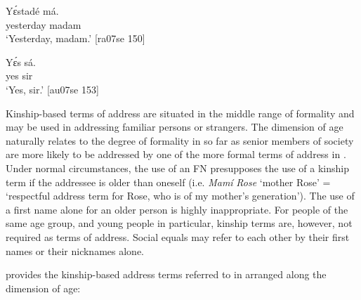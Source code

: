 \ea%
    \label{ex:key:1675}
    \gll Yɛ́stadé    má.\\
yesterday  madam\\

\glt ‘Yesterday, madam.’ [ra07se 150]
\z


\ea%
    \label{ex:key:1676}
    \gll Yɛ́s  sá.\\
yes  sir\\

\glt ‘Yes, sir.’ [au07se 153]
\z

Kinship-based terms of address are situated in the middle range of formality and may be used in addressing familiar persons or strangers. The dimension of age naturally relates to the degree of formality in so far as senior members of society are more likely to be addressed by one of the more formal terms of address in . Under normal circumstances, the use of an FN presupposes the use of a kinship term if the addressee is older than oneself (i.e. \textit{Mamí} \textit{Rose} ‘mother Rose’ = ‘respectful address term for Rose, who is of my mother’s generation’). The use of a first name alone for an older person is highly inappropriate. For people of the same age group, and young people in particular, kinship terms are, however, not required as terms of address. Social equals may refer to each other by their first names or their nicknames alone.


  provides the kinship-based address terms referred to in  arranged along the dimension of age: 


